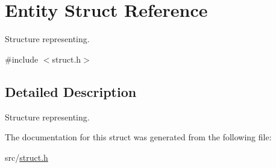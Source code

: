 \hypertarget{struct_entity}{}\section{Entity Struct Reference}
\label{struct_entity}


Structure representing.  




{\ttfamily \#include $<$struct.\+h$>$}



\subsection{Detailed Description}
Structure representing. 

The documentation for this struct was generated from the following file\+:\begin{DoxyCompactItemize}
\item 
src/\hyperlink{struct_8h}{struct.\+h}\end{DoxyCompactItemize}
